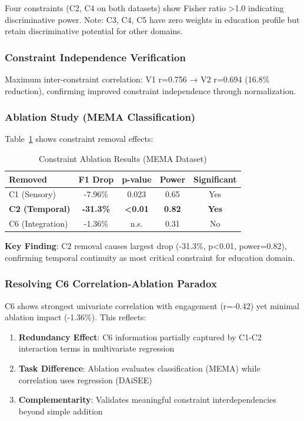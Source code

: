 \documentclass[10pt,journal,compsoc]{IEEEtran}
\begin{document}
Four constraints (C2, C4 on both datasets) show Fisher ratio >1.0 indicating discriminative power. Note: C3, C4, C5 have zero weights in education profile but retain discriminative potential for other domains.

\subsubsection{Constraint Independence Verification}

Maximum inter-constraint correlation: V1 r=0.756 → V2 r=0.694 (16.8\% reduction), confirming improved constraint independence through normalization.

\subsubsection{Ablation Study (MEMA Classification)}

Table~\ref{tab:ablation} shows constraint removal effects:

\begin{table}[!t]
\renewcommand{\arraystretch}{1.3}
\caption{Constraint Ablation Results (MEMA Dataset)}
\label{tab:ablation}
\centering
\begin{tabular}{lcccc}
\toprule
\textbf{Removed} & \textbf{F1 Drop} & \textbf{p-value} & \textbf{Power} & \textbf{Significant} \\
\midrule
C1 (Sensory) & -7.96\% & 0.023 & 0.65 & Yes \\
\textbf{C2 (Temporal)} & \textbf{-31.3\%} & \textbf{<0.01} & \textbf{0.82} & \textbf{Yes} \\
C6 (Integration) & -1.36\% & n.s. & 0.31 & No \\
\bottomrule
\end{tabular}
\end{table}

\textbf{Key Finding}: C2 removal causes largest drop (-31.3\%, p<0.01, power=0.82), confirming temporal continuity as most critical constraint for education domain.

\subsubsection{Resolving C6 Correlation-Ablation Paradox}

C6 shows strongest univariate correlation with engagement (r=-0.42) yet minimal ablation impact (-1.36\%). This reflects:

\begin{enumerate}
    \item \textbf{Redundancy Effect}: C6 information partially captured by C1-C2 interaction terms in multivariate regression
    \item \textbf{Task Difference}: Ablation evaluates classification (MEMA) while correlation uses regression (DAiSEE)
    \item \textbf{Complementarity}: Validates meaningful constraint interdependencies beyond simple addition
\end{enumerate}
\end{document}
